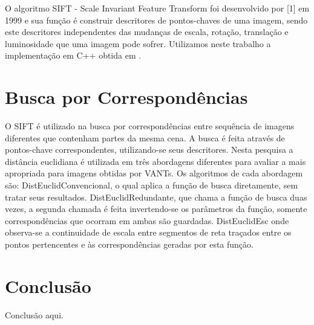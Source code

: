 \documentclass[9pt, a4paper, nofonttune, journal]{IEEEtran}
\begin{document}
O algoritmo SIFT - Scale Invariant Feature Transform foi desenvolvido por [1] em 1999 e sua função é construir descritores de pontos-chaves de uma imagem, sendo este descritores independentes das mudanças de escala, rotação, translação e luminosidade que uma imagem pode sofrer. Utilizamos neste trabalho a implementação em C++ obtida em \cite{vedaldi}.

\section{Busca por Correspondências}

O SIFT é utilizado na busca por correspondências entre sequência de imagens diferentes que contenham partes da mesma cena. A busca é feita através de pontos-chave correspondentes, utilizando-se seus descritores. Nesta pesquisa a distância euclidiana é utilizada em três abordagens diferentes para avaliar a mais apropriada para imagens obtidas por VANTs. Os algoritmos de cada abordagem são: DistEuclidConvencional, o qual aplica a função de busca diretamente, sem tratar seus resultados. DistEuclidRedundante, que chama a função de busca duas vezes, a segunda chamada é feita invertendo-se os parâmetros da função, somente correspondências que ocorram em ambas são guardadas. DistEuclidEsc onde observa-se a continuidade de escala entre segmentos de reta traçados entre os pontos pertencentes e às correspondências geradas por esta função.


\section{Conclusão}
Conclusão aqui.
\end{document}
